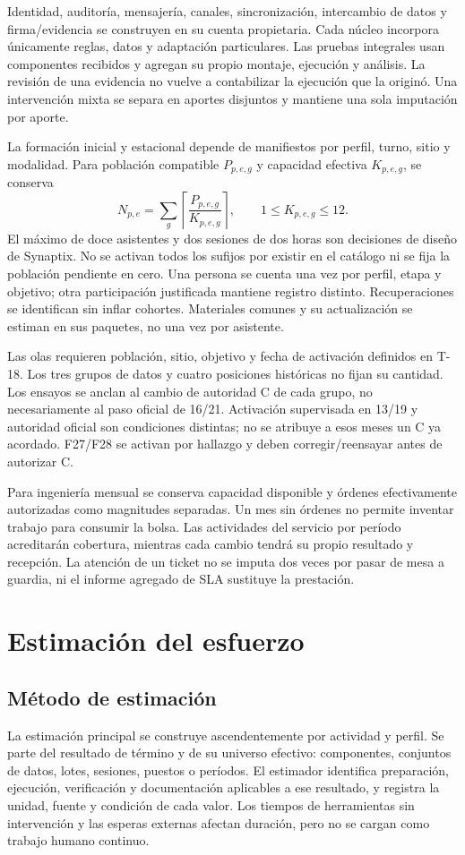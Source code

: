 Identidad, auditoría, mensajería, canales, sincronización, intercambio de datos y firma/evidencia se construyen en su cuenta propietaria. Cada núcleo incorpora únicamente reglas, datos y adaptación particulares. Las pruebas integrales usan componentes recibidos y agregan su propio montaje, ejecución y análisis. La revisión de una evidencia no vuelve a contabilizar la ejecución que la originó. Una intervención mixta se separa en aportes disjuntos y mantiene una sola imputación por aporte.

La formación inicial y estacional depende de manifiestos por perfil, turno, sitio y modalidad. Para población compatible $P_{p,e,g}$ y capacidad efectiva $K_{p,e,g}$, se conserva
\[
N_{p,e}=\sum_g\left\lceil\frac{P_{p,e,g}}{K_{p,e,g}}\right\rceil,
\qquad 1\leq K_{p,e,g}\leq12.
\]
El máximo de doce asistentes y dos sesiones de dos horas son decisiones de diseño de Synaptix. No se activan todos los sufijos por existir en el catálogo ni se fija la población pendiente en cero. Una persona se cuenta una vez por perfil, etapa y objetivo; otra participación justificada mantiene registro distinto. Recuperaciones se identifican sin inflar cohortes. Materiales comunes y su actualización se estiman en sus paquetes, no una vez por asistente.

Las olas requieren población, sitio, objetivo y fecha de activación definidos en T-18. Los tres grupos de datos y cuatro posiciones históricas no fijan su cantidad. Los ensayos se anclan al cambio de autoridad C de cada grupo, no necesariamente al paso oficial de 16/21. Activación supervisada en 13/19 y autoridad oficial son condiciones distintas; no se atribuye a esos meses un C ya acordado. F27/F28 se activan por hallazgo y deben corregir/reensayar antes de autorizar C.

Para ingeniería mensual se conserva capacidad disponible y órdenes efectivamente autorizadas como magnitudes separadas. Un mes sin órdenes no permite inventar trabajo para consumir la bolsa. Las actividades del servicio por período acreditarán cobertura, mientras cada cambio tendrá su propio resultado y recepción. La atención de un ticket no se imputa dos veces por pasar de mesa a guardia, ni el informe agregado de SLA sustituye la prestación.




\section{Estimación del esfuerzo}\label{sec:t15-estimacion}
\subsection{Método de estimación}
La estimación principal se construye ascendentemente por actividad y perfil. Se parte del resultado de término y de su universo efectivo: componentes, conjuntos de datos, lotes, sesiones, puestos o períodos. El estimador identifica preparación, ejecución, verificación y documentación aplicables a ese resultado, y registra la unidad, fuente y condición de cada valor. Los tiempos de herramientas sin intervención y las esperas externas afectan duración, pero no se cargan como trabajo humano continuo.

